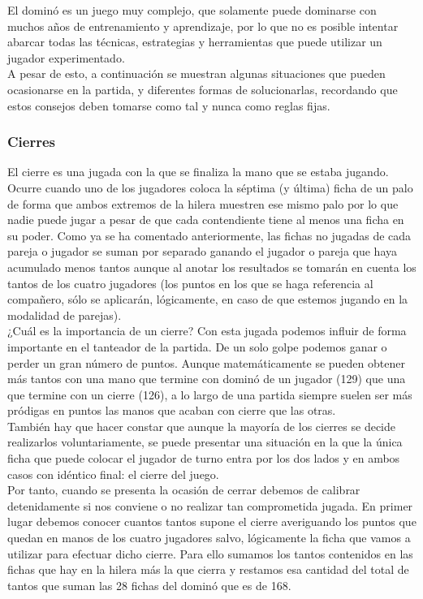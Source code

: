 El dominó es un juego muy complejo, que solamente puede dominarse con muchos años de entrenamiento y aprendizaje, por
lo que no es posible intentar abarcar todas las técnicas, estrategias y herramientas que puede utilizar un jugador
experimentado. \\

A pesar de esto, a continuación se muestran algunas situaciones que pueden ocasionarse en la partida, y diferentes
formas de solucionarlas, recordando que estos consejos deben tomarse como tal y nunca como reglas fijas.

\subsubsection{Cierres}

El cierre es una jugada con la que se finaliza la mano que se estaba jugando. Ocurre cuando uno de los jugadores coloca la
séptima (y última) ficha de un palo de forma que ambos extremos de la hilera muestren ese mismo palo por lo que nadie puede
jugar a pesar de que cada contendiente tiene al menos una ficha en su poder. Como ya se ha comentado anteriormente,
las fichas no jugadas de cada pareja o jugador se suman por separado ganando el jugador o pareja que haya acumulado menos
tantos aunque al anotar los resultados se tomarán en cuenta los tantos de los cuatro jugadores (los puntos en los que se
haga referencia al compañero, sólo se aplicarán, lógicamente, en caso de que estemos jugando en la modalidad de parejas). \\

¿Cuál es la importancia de un cierre? Con esta jugada podemos influir de forma importante en el tanteador de la partida.
De un solo golpe podemos ganar o perder un gran número de puntos. Aunque matemáticamente se pueden obtener más tantos con
una mano que termine con dominó de un jugador (129) que una que termine con un cierre (126), a lo largo de una partida
siempre suelen ser más pródigas en puntos las manos que acaban con cierre que las otras. \\

También hay que hacer constar que aunque la mayoría de los cierres se decide realizarlos voluntariamente, se puede presentar
una situación en la que la única ficha que puede colocar el jugador de turno entra por los dos lados y en ambos casos con
idéntico final: el cierre del juego. \\

Por tanto, cuando se presenta la ocasión de cerrar debemos de calibrar detenidamente si nos conviene o no realizar tan
comprometida jugada. En primer lugar debemos conocer cuantos tantos supone el cierre averiguando los puntos que quedan
en manos de los cuatro jugadores salvo, lógicamente la ficha que vamos a utilizar para efectuar dicho cierre. Para ello
sumamos los tantos contenidos en las fichas que hay en la hilera más la que cierra y restamos esa cantidad del total de
tantos que suman las 28 fichas del dominó que es de 168. \\

